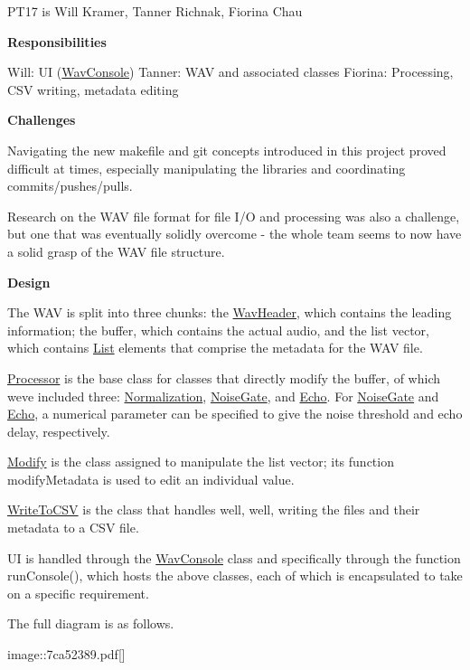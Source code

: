 P\+T17 is Will Kramer, Tanner Richnak, Fiorina Chau

{\bfseries Responsibilities}

Will\+: UI (\hyperlink{classWavConsole}{Wav\+Console}) Tanner\+: W\+AV and associated classes Fiorina\+: Processing, C\+SV writing, metadata editing

{\bfseries Challenges}

Navigating the new makefile and git concepts introduced in this project proved difficult at times, especially manipulating the libraries and coordinating commits/pushes/pulls.

Research on the W\+AV file format for file I/O and processing was also a challenge, but one that was eventually solidly overcome -\/ the whole team seems to now have a solid grasp of the W\+AV file structure.

{\bfseries Design}

The W\+AV is split into three chunks\+: the \hyperlink{structWavHeader}{Wav\+Header}, which contains the leading information; the buffer, which contains the actual audio, and the list vector, which contains \hyperlink{structList}{List} elements that comprise the metadata for the W\+AV file.

\hyperlink{classProcessor}{Processor} is the base class for classes that directly modify the buffer, of which we\textquotesingle{}ve included three\+: \hyperlink{classNormalization}{Normalization}, \hyperlink{classNoiseGate}{Noise\+Gate}, and \hyperlink{classEcho}{Echo}. For \hyperlink{classNoiseGate}{Noise\+Gate} and \hyperlink{classEcho}{Echo}, a numerical parameter can be specified to give the noise threshold and echo delay, respectively.

\hyperlink{classModify}{Modify} is the class assigned to manipulate the list vector; its function modify\+Metadata is used to edit an individual value.

\hyperlink{classWriteToCSV}{Write\+To\+C\+SV} is the class that handles well, well, writing the files and their metadata to a C\+SV file.

UI is handled through the \hyperlink{classWavConsole}{Wav\+Console} class and specifically through the function run\+Console(), which hosts the above classes, each of which is encapsulated to take on a specific requirement.

The full diagram is as follows.

image\+:\+:7ca52389.\+pdf\mbox{[}\mbox{]} 